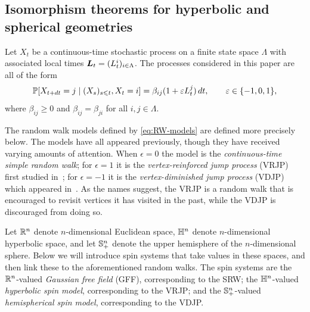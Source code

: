 \documentclass[11pt,a4paper]{article}
\begin{document}
\subsection{Isomorphism theorems for hyperbolic and spherical
  geometries}
\label{sec:isom-theor-hyperb}

Let $X_{t}$ be a continuous-time stochastic process on a finite state
space $\Lambda$ with associated local times
$\boldsymbol{L}_{t} = (L_{t}^{i})_{i\in\Lambda}$.  The processes considered in
this paper are all of the form
\begin{equation}
  \label{eq:RW-models}
  \P\cb{X_{t+dt}=j \mid (X_{s})_{s\leq t}, X_{t}=i} =
  \beta_{ij}(1+\epsilon L^{j}_{t})\,dt, \qquad \epsilon\in \{-1,0,1\},
\end{equation}
where $\beta_{ij}\geq 0$ and $\beta_{ij}=\beta_{ji}$ for all $i,j\in\Lambda$.

The random walk models defined by \eqref{eq:RW-models} are
defined more precisely below. The models have all appeared
previously, though they have received varying amounts of
attention. When $\epsilon=0$ the model is the \emph{continuous-time simple
  random walk}; for $\epsilon=1$ it is the \emph{vertex-reinforced
  jump process} (VRJP) first studied in~\cite{MR1900324,MR2027294};
for $\epsilon=-1$ it is the \emph{vertex-diminished jump process}
(VDJP) which appeared in~\cite{MR3520013}. As the names suggest, the
VRJP is a random walk that is encouraged to revisit vertices it has
visited in the past, while the VDJP is discouraged from doing so.

Let $\mathbb{R}^{n}$ denote $n$-dimensional Euclidean space, $\mathbb{H}^{n}$ denote
$n$-dimensional hyperbolic space, and let ${\mathbb S}^{n}_{+}$ denote the
upper hemisphere of the $n$-dimensional sphere. Below we will
introduce spin systems that take values in these spaces, and then
link these to the aforementioned random walks. The
spin systems are the $\mathbb{R}^{n}$-valued \emph{Gaussian free field} (GFF),
corresponding to the SRW; the $\mathbb{H}^{n}$-valued \emph{hyperbolic spin
  model}, corresponding to the VRJP; and the ${\mathbb S}^{n}_{+}$-valued
\emph{hemispherical spin model}, corresponding to the VDJP.
\end{document}

